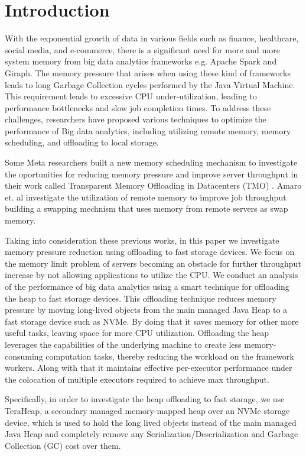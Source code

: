 \section{Introduction}
\label{sec:intro}

With the exponential growth of data in various fields such as finance,
healthcare, social media, and e-commerce, there is a significant need
for more and more system memory from big data analytics frameworks e.g.
Apache Spark \cite{Spark} and Giraph. 
The memory pressure that arises when using these kind of frameworks leads to
long Garbage Collection cycles performed by the Java Virtual Machine.
This requirement leads to excessive CPU under-utilization, 
leading to performance bottlenecks and slow job completion
times. To address these challenges, researchers have proposed various
techniques to optimize the performance of Big data analytics, including
utilizing remote memory, memory scheduling, and offloading to local storage.

Some Meta researchers built a new memory scheduling mechanism to investigate the oportunities
for reducing memory pressure and improve server throughput in their work called Transparent Memory Offloading in Datacenters (TMO) 
\cite{TMO}. Amaro et. al investigate the utilization of remote memory to improve job throughput \cite{CFM} building a swapping mechnism that uses memory 
from remote servers as swap memory. 

Taking into consideration these previous works,
in this paper we investigate memory pressure reduction using offloading to fast storage devices.
We focus on the memory limit problem of servers
becoming an obstacle for further throughput increase by not
allowing applications to utilize the CPU. We conduct an
analysis of the performance of big data analytics using a smart
technique for offloading the heap to fast storage devices.
This offloading technique reduces memory pressure by
moving long-lived objects from the main managed Java
Heap to a fast storage device such as NVMe. By doing that it saves memory for
other more useful tasks, leaving space for more CPU utilization.
Offloading the heap leverages the capabilities of the underlying machine to
create less memory-consuming computation tasks, thereby reducing the
workload on the framework workers. Along with that it maintains effective
per-executor performance under the colocation of multiple executors
required to achieve max throughput.

Specifically, in order to investigate the heap offloading to fast storage,
we use TeraHeap,\cite{TeraHeap} a secondary managed
memory-mapped heap over an NVMe storage device, which is used to hold
the long lived objects instead of the main
managed Java Heap and completely remove any
Serialization/Deserialization and Garbage Collection (GC) cost over
them.

